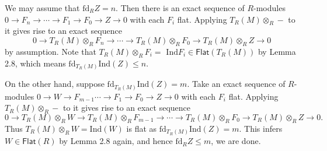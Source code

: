 \documentclass[10pt,twoside]{amsart}
\theoremstyle{bfupright head,slanted body}
\theoremstyle{bfupright head,upright body}
\theoremstyle{fixed bf head,slanted body}
\theoremstyle{fixed bf head,upright body}
\theoremstyle{numbered paragraph}
\newenvironment{prf*}[1][Proof]{%
  \begin{proof}[\bf #1]
    \setcounter{equation}{0}
    \renewcommand{\theequation}{\arabic{equation}}}
  {\end{proof}
}
\numberwithin{equation}{res}
\newcommand{\fd}{\mathrm{fd}}
\newcommand{\Flat}{\mathsf{Flat}}
\newcommand{\Ind}{\mathrm{Ind}}
\begin{document}
\begin{prf*}
We may assume that $\fd_R Z= n$.
Then there is an exact sequence of $R$-modules
$0\to F_{n}\to \cdots\to F_{1}\to F_{0}\to Z\to 0$
with each $F_{i}$ flat. Applying $T_R(M)\otimes_{R}-$ to it gives rise to an exact sequence
$$0\to T_R(M)\otimes_{R}F_{n}\to \cdots\to T_R(M)\otimes_{R}F_{0}\to T_R(M)\otimes_{R}Z\to 0$$ 
by assumption. Note that $T_R(M)\otimes_{R}F_{i}=$ $\Ind F_{i}\in \Flat(T_R(M))$ by Lemma 2.8,
which means $\fd_{T_R(M)}\Ind(Z) \leqslant n$.

On the other hand, suppose $\fd_{T_R(M)}\Ind(Z)= m$. Take an exact sequence of $R$-modules
$0\to W\to F_{m-1}\cdots\to F_{1}\to F_{0}\to Z\to 0$ with each $F_{i}$ flat.
Applying $T_R(M)\otimes_{R}-$ to it gives rise to an exact sequence
$$0\to T_R(M)\otimes_{R}W\to T_R(M)\otimes_{R}F_{m-1}\to \cdots\to T_R(M)\otimes_{R}F_{0}\to T_R(M)\otimes_{R}Z\to 0.$$ 
Thus $T_R(M)\otimes_{R}W =\Ind(W)$ is flat as $\fd_{T_R(M)}\Ind(Z) = m$.
This infers $W\in\Flat(R)$ by Lemma 2.8 again, and hence $\fd_R Z \leqslant m$, we are done.
 \end{prf*}
\end{document}
